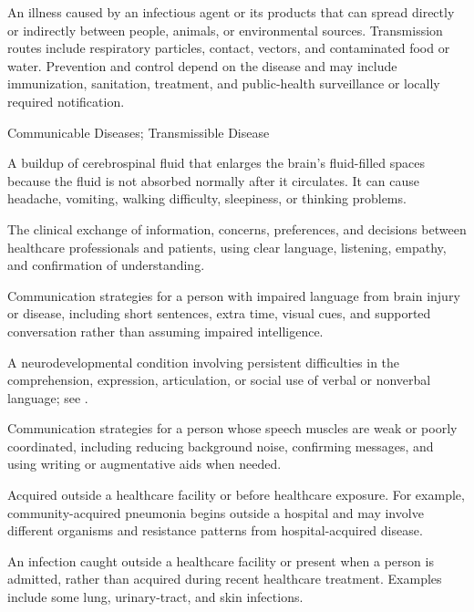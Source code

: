  An illness caused by an infectious agent or
its products that can spread directly or indirectly between people, animals,
or environmental sources. Transmission routes include respiratory particles,
contact, vectors, and contaminated food or water. Prevention and control depend
on the disease and may include immunization, sanitation, treatment, and
public-health surveillance or locally required notification.

\synonyms
Communicable Diseases; Transmissible Disease

 A buildup of cerebrospinal fluid that enlarges the brain's fluid-filled spaces because the fluid is not absorbed normally after it circulates. It can cause headache, vomiting, walking difficulty, sleepiness, or thinking problems.

 The clinical exchange of information, concerns, preferences, and decisions between healthcare professionals and patients, using clear language, listening, empathy, and confirmation of understanding.

 Communication strategies for a person with impaired language from brain injury or disease, including short sentences, extra time, visual cues, and supported conversation rather than assuming impaired intelligence.

 A neurodevelopmental condition involving persistent difficulties in the comprehension, expression, articulation, or social use of verbal or nonverbal language; see .

 Communication strategies for a person whose speech muscles are weak or poorly coordinated, including reducing background noise, confirming messages, and using writing or augmentative aids when needed.

 Acquired outside a healthcare facility or before healthcare exposure. For example, community-acquired pneumonia begins outside a hospital and may involve different organisms and resistance patterns from hospital-acquired disease.

 An infection caught outside a healthcare facility or present when a person is admitted, rather than acquired during recent healthcare treatment. Examples include some lung, urinary-tract, and skin infections.

